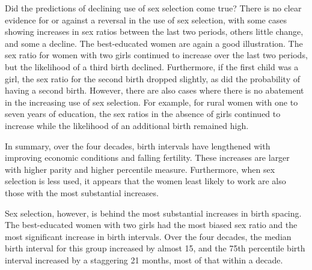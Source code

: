 \documentclass[12pt,letterpaper]{article}
\begin{document}



Did the predictions of declining use of sex selection come true? 
There is no clear evidence for or against a reversal in the use of sex selection, with 
some cases showing increases in sex ratios between the last two periods, others little 
change, and some a decline. 
The best-educated women are again a good illustration. 
The sex ratio for women with two girls continued to increase over the last two periods, 
but the likelihood of a third birth declined. 
Furthermore, if the first child was a girl, the sex ratio for the second birth dropped 
slightly, as did the probability of having a second birth. 
However, there are also cases where there is no abatement in the increasing use of sex 
selection. 
For example, for rural women with one to seven years of education, the sex ratios in the 
absence of girls continued to increase while the likelihood of an additional birth remained 
high.


In summary, over the four decades, birth intervals have lengthened with improving economic 
conditions and falling fertility. 
These increases are larger with higher parity and higher percentile measure. 
Furthermore, when sex selection is less used, it appears that the women least likely to 
work are also those with the most substantial increases.

Sex selection, however, is behind the most substantial increases in birth spacing. 
The best-educated women with two girls had the most biased sex ratio and the most 
significant increase in birth intervals. 
Over the four decades, the median birth interval for this group increased by almost 15, 
and the 75th percentile birth interval increased by a staggering 21 months, most of that 
within a decade.
\end{document}
